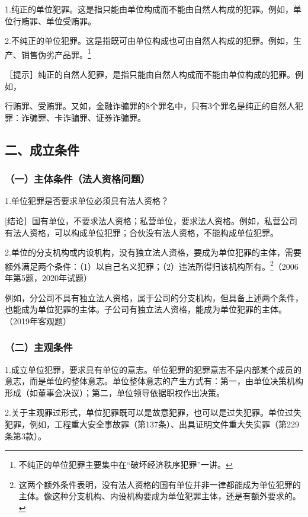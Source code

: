 1.纯正的单位犯罪。这是指只能由单位构成而不能由自然人构成的犯罪。例如，单位行贿罪、单位受贿罪。

2.不纯正的单位犯罪。这是指既可由单位构成也可由自然人构成的犯罪。例如，生产、销售伪劣产品罪。\footnote{不纯正的单位犯罪主要集中在“破坏经济秩序犯罪”一讲。}

［提示］纯正的自然人犯罪，是指只能由自然人构成而不能由单位构成的犯罪。例如，

行贿罪、受贿罪。又如，金融诈骗罪的8个罪名中，只有3个罪名是纯正的自然人犯罪：诈骗罪、卡诈骗罪、证券诈骗罪。

\subsection*{二、成立条件}

\subsubsection*{（一）主体条件（法人资格问题）}

1.单位犯罪是否要求单位必须具有法人资格？

[结论］国有单位，不要求法人资格；私营单位，要求法人资格。例如，私营公司有法人资格，可以构成单位犯罪；合伙没有法人资格，不能构成单位犯罪。

2.单位的分支机构或内设机构，没有独立法人资格，要成为单位犯罪的主体，需要额外满足两个条件：（1）以自己名义犯罪；（2）违法所得归该机构所有。\footnote{这两个额外条件表明，没有法人资格的国有单位并非一律都能成为单位犯罪的主体。像这种分支机构、内设机构要成为单位犯罪主体，还是有额外要求的。}（2006年第5题，2020年试题）

例如，分公司不具有独立法人资格，属于公司的分支机构，但具备上述两个条件，也能成为单位犯罪的主体。子公司有独立法人资格，能成为单位犯罪的主体。（2019年客观题）

\subsubsection*{（二）主观条件}

1.成立单位犯罪，要求具有单位的意志。单位犯罪的犯罪意志不是内部某个成员的意志，而是单位的整体意志。单位整体意志的产生方式有：第一，由单位决策机构形成（如董事会决议）；第二，单位领导依据职权作出决策。

2.关于主观罪过形式，单位犯罪既可以是故意犯罪，也可以是过失犯罪。单位过失犯罪，例如，工程重大安全事故罪（第137条）、出具证明文件重大失实罪（第229条第3款）。

